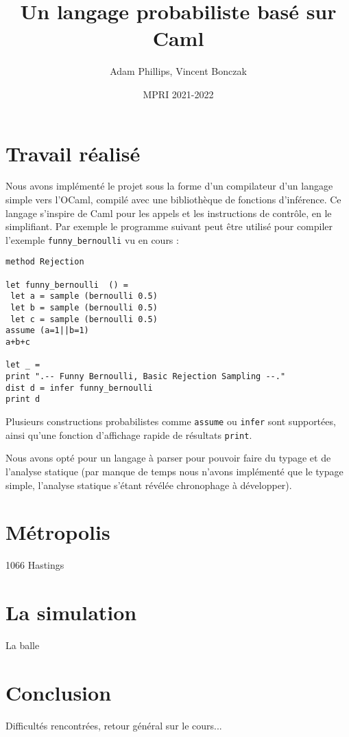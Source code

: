 \documentclass[svgnames]{article}
\begin{document}
\title{Un langage probabiliste basé sur Caml}

\author{Adam Phillips, Vincent Bonczak}

\date{MPRI 2021-2022}

\maketitle

\section{Travail réalisé}

Nous avons implémenté le projet sous la forme d'un compilateur d'un langage simple vers l'OCaml, compilé avec une bibliothèque de fonctions d'inférence.
Ce langage s'inspire de Caml pour les appels et les instructions de contrôle, en le simplifiant. Par exemple le programme suivant peut être utilisé pour compiler l'exemple \verb|funny_bernoulli| vu en cours :
\begin{lstlisting}
method Rejection

let funny_bernoulli  () =  
 let a = sample (bernoulli 0.5)  
 let b = sample (bernoulli 0.5)  
 let c = sample (bernoulli 0.5) 
assume (a=1||b=1)
a+b+c

let _ = 
print ".-- Funny Bernoulli, Basic Rejection Sampling --."
dist d = infer funny_bernoulli  
print d
\end{lstlisting}

\bigskip

Plusieurs constructions probabilistes comme \verb|assume| ou \verb|infer| sont supportées, ainsi qu'une fonction d'affichage rapide de résultats \verb|print|.

Nous avons opté pour un langage à parser pour pouvoir faire du typage et de l'analyse statique (par manque de temps nous n'avons implémenté que le typage simple,
l'analyse statique s'étant révélée chronophage à développer).

\section{Métropolis}

1066 Hastings

\section{La simulation}

La balle

\section{Conclusion}

Difficultés rencontrées, retour général sur le cours...
\end{document}
